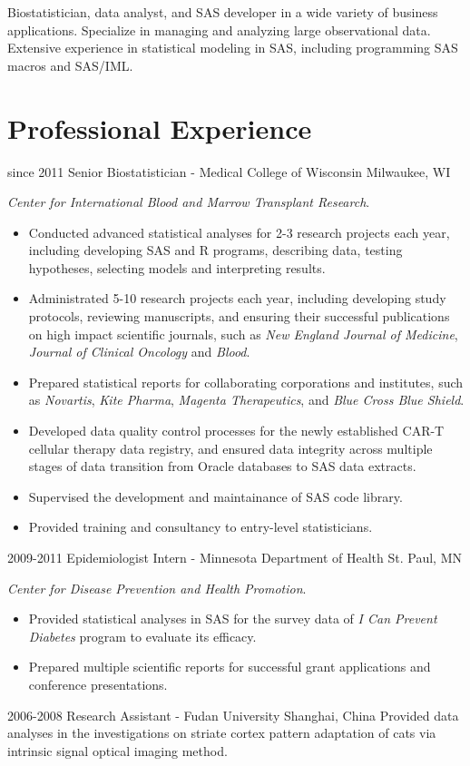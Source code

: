 Biostatistician, data analyst, and SAS developer in a wide variety of business applications. Specialize in managing and analyzing large observational data. Extensive experience in statistical modeling in SAS, including programming SAS macros and SAS/IML.\\

\section{Professional Experience}

\begin{entrylist}
  \entry
    {since 2011}
    {Senior Biostatistician - Medical College of Wisconsin}
    {Milwaukee, WI}
    {
    \textit{Center for International Blood and Marrow Transplant Research}.
    \begin{itemize}
      \item Conducted advanced statistical analyses for 2-3 research projects each year, including developing SAS and R programs, describing data, testing hypotheses, selecting models and interpreting results.
      \item Administrated 5-10 research projects each year, including developing study protocols, reviewing manuscripts, and ensuring their successful publications on high impact scientific journals, such as \textit{New England Journal of Medicine}, \textit{Journal of Clinical Oncology} and \textit{Blood}.
      \item Prepared statistical reports for collaborating corporations and institutes, such as \textit{Novartis}, \textit{Kite Pharma}, \textit{Magenta Therapeutics}, and \textit{Blue Cross Blue Shield}.
      \item Developed data quality control processes for the newly established CAR-T cellular therapy data registry, and ensured data integrity across multiple stages of data transition from Oracle databases to SAS data extracts.
      \item Supervised the development and maintainance of SAS code library.
      \item Provided training and consultancy to entry-level statisticians.
    \end{itemize}
    }
  \entry
    {2009-2011}
    {Epidemiologist Intern - Minnesota Department of Health}
    {St. Paul, MN}
    {
    \textit{Center for Disease Prevention and Health Promotion}.
    \begin{itemize}
      \item Provided statistical analyses in SAS for the survey data of \textit{I Can Prevent Diabetes} program to evaluate its efficacy.
      \item Prepared multiple scientific reports for successful grant applications and conference presentations.
    \end{itemize}
    }
  \entry
    {2006-2008}
    {Research Assistant - Fudan University}
    {Shanghai, China}
    {Provided data analyses in the investigations on striate cortex pattern adaptation of cats via intrinsic signal optical imaging method.}
\end{entrylist}

